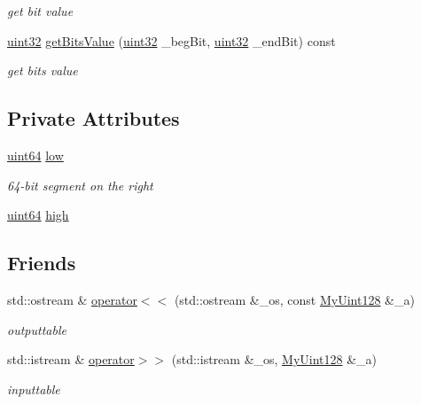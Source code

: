 \begin{DoxyCompactItemize}
\begin{DoxyCompactList}\small\item\em get bit value \end{DoxyCompactList}\item 
\hyperlink{types_8h_abd01e8e67e3d94cab04ecaaf4f85ac1b}{uint32} \hyperlink{structMyUint128_a06269e9467a4c4e61dcd9a6d5d07c794}{get\-Bits\-Value} (\hyperlink{types_8h_abd01e8e67e3d94cab04ecaaf4f85ac1b}{uint32} \-\_\-beg\-Bit, \hyperlink{types_8h_abd01e8e67e3d94cab04ecaaf4f85ac1b}{uint32} \-\_\-end\-Bit) const 
\begin{DoxyCompactList}\small\item\em get bits value \end{DoxyCompactList}\end{DoxyCompactItemize}
\subsection*{Private Attributes}
\begin{DoxyCompactItemize}
\item 
\hyperlink{types_8h_aeefdb2888fa3c58f2454ef004419e6a5}{uint64} \hyperlink{structMyUint128_a294d997f622685c41ad42040ff9ea1cf}{low}
\begin{DoxyCompactList}\small\item\em 64-\/bit segment on the right \end{DoxyCompactList}\item 
\hyperlink{types_8h_aeefdb2888fa3c58f2454ef004419e6a5}{uint64} \hyperlink{structMyUint128_a6888141e5c5e44242a144e37230a55e4}{high}
\end{DoxyCompactItemize}
\subsection*{Friends}
\begin{DoxyCompactItemize}
\item 
std\-::ostream \& \hyperlink{structMyUint128_afe33d92353637659c435a1f5a4efaf99}{operator$<$$<$} (std\-::ostream \&\-\_\-os, const \hyperlink{structMyUint128}{My\-Uint128} \&\-\_\-a)
\begin{DoxyCompactList}\small\item\em outputtable \end{DoxyCompactList}\item 
std\-::istream \& \hyperlink{structMyUint128_ae6f858d18e068ec033c76627bb2f75b1}{operator$>$$>$} (std\-::istream \&\-\_\-os, \hyperlink{structMyUint128}{My\-Uint128} \&\-\_\-a)
\begin{DoxyCompactList}\small\item\em inputtable \end{DoxyCompactList}\end{DoxyCompactItemize}


